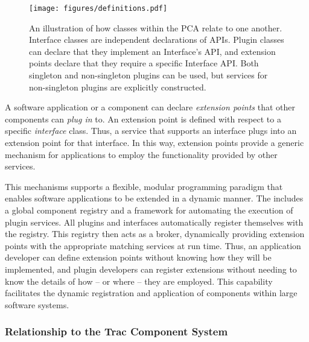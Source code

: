 \begin{figure}[htb]
  \center
  \texttt{[image: figures/definitions.pdf]}
  \caption{An illustration of how classes within the PCA relate to one another.  Interface classes are independent declarations of APIs.  Plugin classes can declare that they implement an Interface's API, and extension points declare that they require a specific
Interface API.  Both singleton and non-singleton plugins can be used, but services for non-singleton plugins are explicitly constructed.}
  \label{fig:defs}
\end{figure}

A software application or a component can declare \textit{extension
points} that other components can \textit{plug in} to. An extension
point is defined with respect to a specific \textit{interface}
class.  Thus, a service that supports an interface plugs into an
extension point for that interface.  In this way, extension points
provide a generic mechanism for applications to employ the functionality
provided by other services.

This mechanisms supports a flexible,
modular programming paradigm that enables software applications to
be extended in a dynamic manner.  The \pcasp includes a global component
registry and a framework for automating the execution of plugin
services.  All plugins and interfaces automatically register themselves
with the registry.  This registry then acts as a broker, dynamically providing
extension points with the appropriate matching services at run time.  
Thus, an application
developer can define extension points without knowing how they will be
implemented, and plugin developers can register extensions without
needing to know the details of how -- or where -- they are employed.
This capability facilitates the dynamic registration
and application of components within large software systems.

\subsubsection{Relationship to the Trac Component System}

